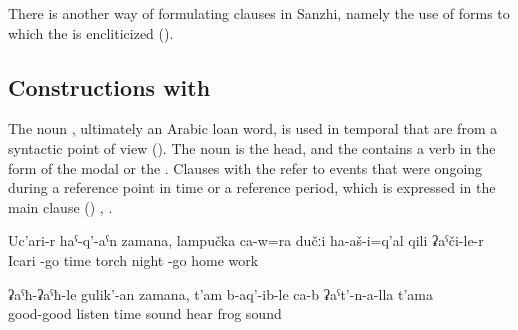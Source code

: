 There is another way of formulating  clauses in Sanzhi, namely the use of  forms to which the  is encliticized ().



\subsection{Constructions with  }
\label{sec:constructions with zamana}

The noun  , ultimately an Arabic loan word, is used in temporal  that are  from a syntactic point of view (). The noun  is the head, and the  contains a verb in the form of the modal or the . Clauses with the  refer to events that were ongoing during a reference point in time or a reference period, which is expressed in the main clause () , .
%
\begin{exe}
	\ex	\label{ex:‎While he came from Icari, he went with a torch at night home from work}
	\gll	Uc'ari-r	haˁ-q'-aˁn	zamana,	lampučka	ca-w=ra	dučːi	ha-aš-i=q'al	qili	ʡaˁči-le-r\\
		Icari	-go	time	torch		night	-go	home	work\\
	\glt	{}

	\ex	\label{ex:‎‎‎When he was attentively listening he heard the sound of frogs}
	\gll	ʡaˁħ-ʡaˁħ-le	gulik'-an	zamana,	t'am	b-aq'-ib-le	ca-b	ʡaˁt'-n-a-lla	t'ama\\
		good-good	listen	time	sound	hear		frog	sound\\
	\glt	{}
\end{exe}

